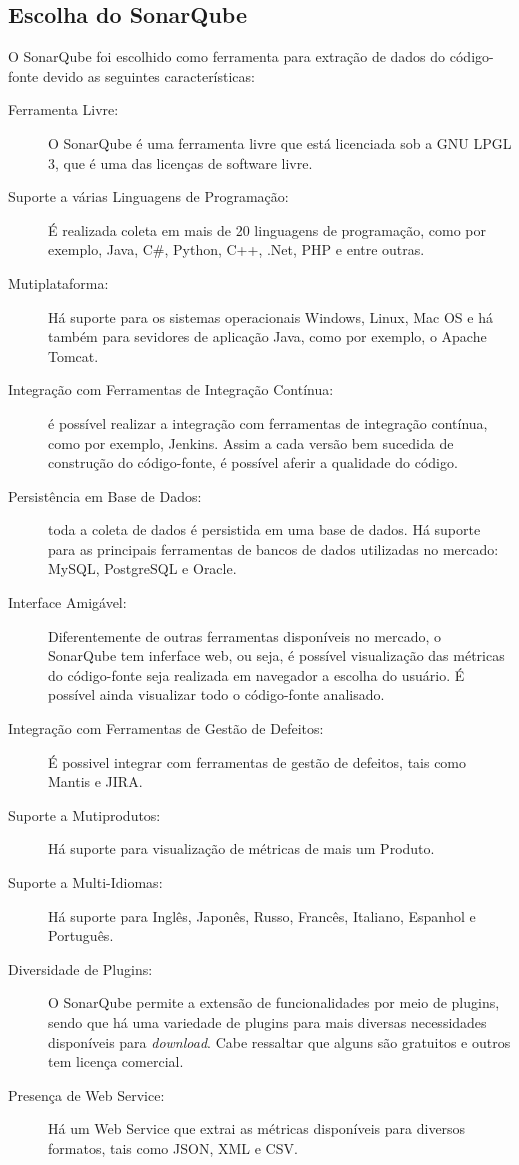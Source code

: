 \subsection{Escolha do SonarQube}
O SonarQube foi escolhido como ferramenta para extração de dados do código-fonte devido as seguintes características:
\begin{description}
 \item [Ferramenta Livre:] O SonarQube é uma ferramenta livre que está licenciada sob a GNU LPGL 3, que é uma das licenças de software livre.

  \item [Suporte a várias Linguagens de Programação:]  É realizada coleta em mais de 20 linguagens de programação, como por 		
	exemplo, Java, C\#, Python, C++, .Net, PHP e entre outras.

  \item [Mutiplataforma:] Há suporte para os sistemas operacionais Windows, Linux, Mac OS e há também para sevidores de aplicação Java, como por exemplo, o Apache Tomcat. 

  \item [Integração com Ferramentas de Integração Contínua:] é possível realizar a integração com ferramentas de integração contínua, como por exemplo, Jenkins. Assim a cada versão bem sucedida de construção do código-fonte, é possível aferir a qualidade do código.

  \item [Persistência em Base de Dados:] toda a coleta de dados é persistida em uma base de dados. Há suporte para as principais ferramentas de bancos de dados utilizadas no mercado: MySQL, PostgreSQL e Oracle.

  \item [Interface Amigável:] Diferentemente de outras ferramentas disponíveis no mercado, o SonarQube tem inferface web, ou seja, é possível visualização das métricas do código-fonte seja realizada em navegador a escolha do usuário. É possível ainda visualizar todo o código-fonte analisado.

\item [Integração com Ferramentas de Gestão de Defeitos:] É possivel integrar com ferramentas de gestão de defeitos, tais como Mantis e JIRA.

\item [Suporte a Mutiprodutos:] Há suporte para visualização de métricas de mais um Produto.

\item [Suporte a Multi-Idiomas:] Há suporte para Inglês, Japonês, Russo, Francês, Italiano, Espanhol e Português.

\item [Diversidade de Plugins:] O SonarQube permite a extensão de funcionalidades por meio de plugins, sendo que há uma variedade de plugins para mais diversas necessidades disponíveis para \textit{download}. Cabe ressaltar que alguns são gratuitos e outros tem licença comercial.

\item [Presença de Web Service:] Há um Web Service que extrai as métricas disponíveis para diversos formatos, tais como JSON, XML e CSV.
\end{description}


